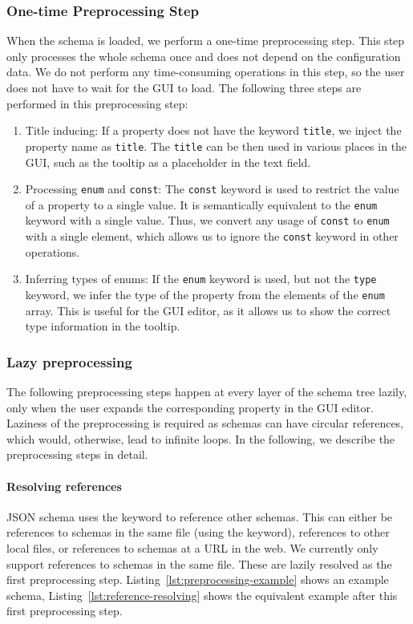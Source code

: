 \subsubsection{One-time Preprocessing Step}
When the schema is loaded, we perform a one-time preprocessing step.
This step only processes the whole schema once and does not depend on the configuration data.
We do not perform any time-consuming operations in this step, so the user does not have to wait for the GUI to load.
The following three steps are performed in this preprocessing step:
\begin{enumerate}
    \item Title inducing: If a property does not have the keyword \texttt{title}, we inject the property name as \texttt{title}.
    The \texttt{title} can be then used in various places in the GUI, such as the tooltip as a placeholder in the text field.
    \item Processing \texttt{enum} and \texttt{const}: The \texttt{const} keyword is used to restrict the value of a property to a single value.
    It is semantically equivalent to the \texttt{enum} keyword with a single value.
    Thus, we convert any usage of \texttt{const} to \texttt{enum} with a single element, which allows us to ignore the \texttt{const} keyword in other operations.
    \item Inferring types of enums: If the \texttt{enum} keyword is used, but not the \texttt{type} keyword, we infer the type of the property from the elements of the \texttt{enum} array.
    This is useful for the GUI editor, as it allows us to show the correct type information in the tooltip.
\end{enumerate}

\subsubsection{Lazy preprocessing}
The following preprocessing steps happen at every layer of the schema tree lazily, only when the user expands the corresponding property in the GUI editor.
Laziness of the preprocessing is required as schemas can have circular references, which would, otherwise, lead to infinite loops.
In the following, we describe the preprocessing steps in detail.

\paragraph{Resolving references}
JSON schema uses the  keyword to reference other schemas.
This can either be references to schemas in the same file (using the  keyword), references to other local files,
or references to schemas at a URL in the web.
We currently only support references to schemas in the same file.
These are lazily resolved as the first preprocessing step.
Listing~\ref{lst:preprocessing-example} shows an example schema, Listing~\ref{lst:reference-resolving} shows the equivalent example after
this first preprocessing step.

